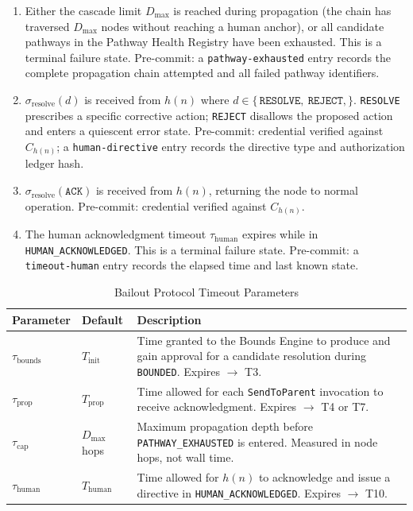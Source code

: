 \begin{enumerate}
\item[\textbf{T7 (ESCALATING $\rightarrow$ PATHWAY\_EXHAUSTED):}] Either the cascade limit $D_{\max}$ is reached during propagation (the chain has traversed $D_{\max}$ nodes without reaching a human anchor), or all candidate pathways in the Pathway Health Registry have been exhausted. This is a terminal failure state. Pre-commit: a \texttt{pathway-exhausted} entry records the complete propagation chain attempted and all failed pathway identifiers.

\item[\textbf{T8 (HUMAN\_ACKNOWLEDGED $\rightarrow$ RESOLVED):}] $\sigma_{\text{resolve}}(d)$ is received from $h(n)$ where $d \in \{\,\texttt{RESOLVE},\ \texttt{REJECT},\}$. \texttt{RESOLVE} prescribes a specific corrective action; \texttt{REJECT} disallows the proposed action and enters a quiescent error state. Pre-commit: credential verified against $C_{h(n)}$; a \texttt{human-directive} entry records the directive type and authorization ledger hash.

\item[\textbf{T9 (HUMAN\_ACKNOWLEDGED $\rightarrow$ IDLE):}] $\sigma_{\text{resolve}}(\texttt{ACK})$ is received from $h(n)$, returning the node to normal operation. Pre-commit: credential verified against $C_{h(n)}$.

\item[\textbf{T10 (HUMAN\_ACKNOWLEDGED $\rightarrow$ TIMEOUT):}] The human acknowledgment timeout $\tau_{\text{human}}$ expires while in \texttt{HUMAN\_ACKNOWLEDGED}. This is a terminal failure state. Pre-commit: a \texttt{timeout-human} entry records the elapsed time and last known state.
\end{enumerate}

\begin{table}[t]
\caption{Bailout Protocol Timeout Parameters}
\label{tab:bp-timeouts}
\medskip
\noindent\begin{tabular}{lp{3cm}p{5.5cm}}
\toprule
\textbf{Parameter} & \textbf{Default} & \textbf{Description} \\
\midrule
$\tau_{\text{bounds}}$ & $T_{\text{init}}$ & Time granted to the Bounds Engine to produce and gain approval for a candidate resolution during \texttt{BOUNDED}. Expires $\rightarrow$ T3. \\
$\tau_{\text{prop}}$ & $T_{\text{prop}}$ & Time allowed for each \texttt{SendToParent} invocation to receive acknowledgment. Expires $\rightarrow$ T4 or T7. \\
$\tau_{\text{cap}}$ & $D_{\max}$ hops & Maximum propagation depth before \texttt{PATHWAY\_EXHAUSTED} is entered. Measured in node hops, not wall time. \\
$\tau_{\text{human}}$ & $T_{\text{human}}$ & Time allowed for $h(n)$ to acknowledge and issue a directive in \texttt{HUMAN\_ACKNOWLEDGED}. Expires $\rightarrow$ T10. \\
\bottomrule
\end{tabular}
\end{table}

